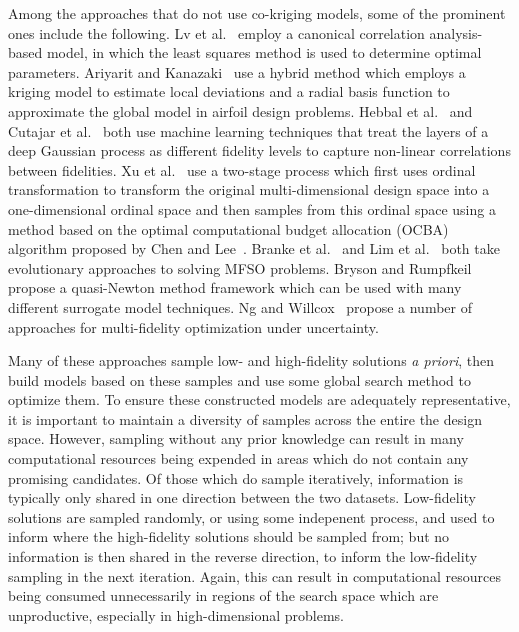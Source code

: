 Among the approaches that do not use co-kriging models, some of the prominent ones include the following. Lv et al.~\cite{lv2021multi} employ a canonical correlation analysis-based model, in which the least squares method is used to determine optimal parameters. Ariyarit and Kanazaki~\cite{ariyarit2017multi} use a hybrid method which employs a kriging model to estimate local deviations and a radial basis function to approximate the global model in airfoil design problems. Hebbal et al.~\cite{hebbal2021multi} and Cutajar et al.~\cite{cutajar2019deep} both use machine learning techniques that treat the layers of a deep Gaussian process as different fidelity levels to capture non-linear correlations between fidelities. Xu et al.~\cite{xu2016mo2tos} use a two-stage process which first uses ordinal transformation to transform the original multi-dimensional design space into a one-dimensional ordinal space and then samples from this ordinal space using a method based on the optimal computational budget allocation (OCBA) algorithm proposed by Chen and Lee~\cite{chen2011stochastic}. Branke et al.~\cite{branke2016efficient} and Lim et al.~\cite{lim2008evolutionary} both take evolutionary approaches to solving MFSO problems. Bryson and Rumpfkeil~\cite{bryson2018multifidelity} propose a quasi-Newton method framework which can be used with many different surrogate model techniques. Ng and Willcox~\cite{ng2014multifidelity} propose a number of approaches for multi-fidelity optimization under uncertainty.

Many of these approaches sample low- and high-fidelity solutions \emph{a priori}, then build models based on these samples and use some global search method to optimize them. To ensure these constructed models are adequately representative, it is important to maintain a diversity of samples across the entire the design space. However, sampling without any prior knowledge can result in many computational resources being expended in areas which do not contain any promising candidates. Of those which do sample iteratively, information is typically only shared in one direction between the two datasets. Low-fidelity solutions are sampled randomly, or using some indepenent process, and used to inform where the high-fidelity solutions should be sampled from; but no information is then shared in the reverse direction, to inform the low-fidelity sampling in the next iteration. Again, this can result in computational resources being consumed unnecessarily in regions of the search space which are unproductive, especially in high-dimensional problems. 

